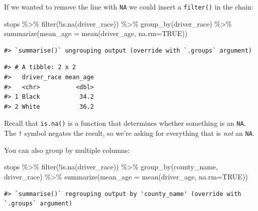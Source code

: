 \documentclass[
]{book}
\newenvironment{Shaded}{\begin{snugshade}}{\end{snugshade}}
\newcommand{\AttributeTok}[1]{\textcolor[rgb]{0.77,0.63,0.00}{#1}}
\newcommand{\ConstantTok}[1]{\textcolor[rgb]{0.00,0.00,0.00}{#1}}
\newcommand{\FunctionTok}[1]{\textcolor[rgb]{0.00,0.00,0.00}{#1}}
\newcommand{\NormalTok}[1]{#1}
\newcommand{\SpecialCharTok}[1]{\textcolor[rgb]{0.00,0.00,0.00}{#1}}
\begin{document}
If we wanted to remove the line with \texttt{NA} we could insert a \texttt{filter()} in the chain:

\begin{Shaded}
\begin{Highlighting}[]
\NormalTok{stops }\SpecialCharTok{\%\textgreater{}\%}
  \FunctionTok{filter}\NormalTok{(}\SpecialCharTok{!}\FunctionTok{is.na}\NormalTok{(driver\_race)) }\SpecialCharTok{\%\textgreater{}\%} 
  \FunctionTok{group\_by}\NormalTok{(driver\_race) }\SpecialCharTok{\%\textgreater{}\%}
  \FunctionTok{summarize}\NormalTok{(}\AttributeTok{mean\_age =} \FunctionTok{mean}\NormalTok{(driver\_age, }\AttributeTok{na.rm=}\ConstantTok{TRUE}\NormalTok{))}
\end{Highlighting}
\end{Shaded}

\begin{verbatim}
#> `summarise()` ungrouping output (override with `.groups` argument)
\end{verbatim}

\begin{verbatim}
#> # A tibble: 2 x 2
#>   driver_race mean_age
#>   <chr>          <dbl>
#> 1 Black           34.2
#> 2 White           36.2
\end{verbatim}

Recall that \texttt{is.na()} is a function that determines whether something is an \texttt{NA}. The \texttt{!} symbol negates the result, so we're asking for everything that is \emph{not} an \texttt{NA}.

You can also group by multiple columns:

\begin{Shaded}
\begin{Highlighting}[]
\NormalTok{stops }\SpecialCharTok{\%\textgreater{}\%} 
  \FunctionTok{filter}\NormalTok{(}\SpecialCharTok{!}\FunctionTok{is.na}\NormalTok{(driver\_race)) }\SpecialCharTok{\%\textgreater{}\%}
  \FunctionTok{group\_by}\NormalTok{(county\_name, driver\_race) }\SpecialCharTok{\%\textgreater{}\%}
  \FunctionTok{summarize}\NormalTok{(}\AttributeTok{mean\_age =} \FunctionTok{mean}\NormalTok{(driver\_age, }\AttributeTok{na.rm=}\ConstantTok{TRUE}\NormalTok{))}
\end{Highlighting}
\end{Shaded}

\begin{verbatim}
#> `summarise()` regrouping output by 'county_name' (override with `.groups` argument)
\end{verbatim}
\end{document}
